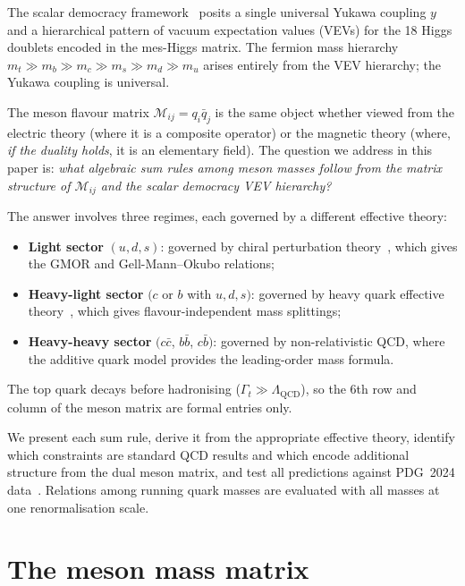 \documentclass[11pt,a4paper]{article}
\newcommand{\QCD}{\ensuremath{\mathrm{QCD}}}
\newcommand{\LQCD}{\Lambda_{\QCD}}
\theoremstyle{plain}
\begin{document}
The scalar democracy framework~\cite{HillMachado2019} posits a single
universal Yukawa coupling $y$ and a hierarchical pattern of vacuum
expectation values (VEVs) for the 18 Higgs doublets encoded in the
mes-Higgs matrix.  The fermion mass hierarchy
$m_t \gg m_b \gg m_c \gg m_s \gg m_d \gg m_u$ arises entirely from the
VEV hierarchy; the Yukawa coupling is universal.

The meson flavour matrix $\mathcal{M}_{ij} = q_i \bar{q}_j$ is the
same object whether viewed from the electric theory (where it is a
composite operator) or the magnetic theory (where, \emph{if the duality
holds}, it is an elementary field).  The question we address in this
paper is: \emph{what algebraic sum rules among meson masses follow from
the matrix structure of $\mathcal{M}_{ij}$ and the scalar democracy
VEV hierarchy?}

The answer involves three regimes, each governed by a different
effective theory:
\begin{itemize}[nosep]
  \item \textbf{Light sector} $(u,d,s)$: governed by chiral
    perturbation theory~\cite{GasserLeutwyler1984,GasserLeutwyler1985},
    which gives the GMOR and Gell-Mann--Okubo relations;
  \item \textbf{Heavy-light sector} $(c$ or $b$ with $u,d,s)$: governed
    by heavy quark effective theory~\cite{ManoharWise2000}, which gives
    flavour-independent mass splittings;
  \item \textbf{Heavy-heavy sector} $(c\bar{c}$, $b\bar{b}$,
    $c\bar{b})$: governed by non-relativistic QCD, where the additive
    quark model provides the leading-order mass formula.
\end{itemize}
The top quark decays before hadronising ($\Gamma_t \gg \LQCD$), so the
6th row and column of the meson matrix are formal entries only.

We present each sum rule, derive it from the appropriate effective
theory, identify which constraints are standard QCD results and which
encode additional structure from the dual meson matrix, and test all
predictions against PDG~2024 data~\cite{PDG2024}.  Relations among
running quark masses are evaluated with all masses at one
renormalisation scale.


\section{The meson mass matrix}
\label{sec:mass-matrix}
\end{document}
